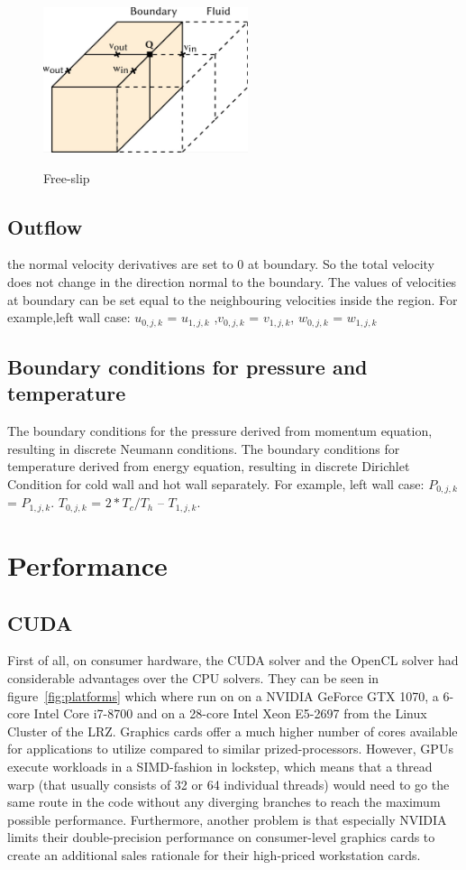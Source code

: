 \documentclass{article}%
\begin{document}
\begin{figure}[h]
    \centering
    \includegraphics[width=6cm, height=5cm]{freeslip}
    \caption{Free-slip}
    \label{fig:mesh1}
\end{figure}

\subsection{Outflow}
the normal velocity derivatives are set to 0 at boundary. So the total velocity does not change in the direction normal to the boundary. The values of velocities at boundary can be set equal to the neighbouring velocities inside the region. For example,left wall case: $u_{0,j,k}$ = $u_{1,j,k}$ ,$v_{0,j,k}$ = $v_{1,j,k}$, $w_{0,j,k}$ = $w_{1,j,k}$
\subsection{Boundary conditions for pressure and temperature}
The boundary conditions for the pressure derived from momentum equation, resulting in discrete Neumann conditions. The boundary conditions for temperature derived from energy equation, resulting in discrete Dirichlet Condition for cold wall and hot wall separately. For example, left wall case: $P_{0,j,k}$ = $P_{1,j,k}$.  $T_{0,j,k}$ = $2*T_c/T_h$ – $T_{1,j,k}$.

\section{Performance}
\subsection{CUDA}
First of all, on consumer hardware, the CUDA solver and the OpenCL solver had considerable advantages over the CPU solvers. They can be seen in figure~\ref{fig:platforms} which where run on on a NVIDIA GeForce GTX 1070, a 6-core Intel Core i7-8700 and on a 28-core Intel Xeon E5-2697 from the Linux Cluster of the LRZ. Graphics cards offer a much higher number of cores available for applications to utilize compared to similar prized-processors. However, GPUs execute workloads in a SIMD-fashion in lockstep, which means that a thread warp (that usually consists of 32 or 64 individual threads) would need to go the same route in the code without any diverging branches to reach the maximum possible performance. Furthermore, another problem is that especially NVIDIA limits their double-precision performance on consumer-level graphics cards to create an additional sales rationale for their high-priced workstation cards.
\end{document}
